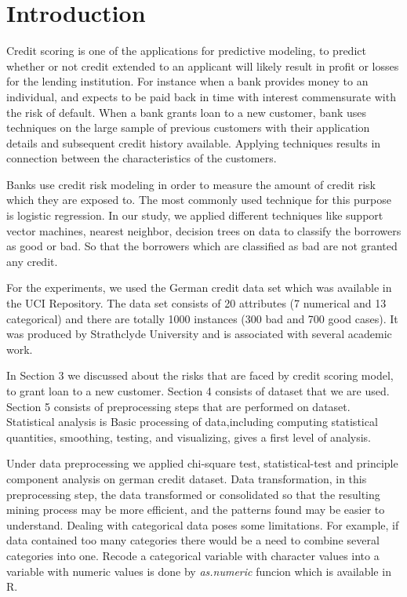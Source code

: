 \documentclass{article}\usepackage[]{graphicx}\usepackage[]{color}
\begin{document}
\section{Introduction} 
\hspace{0.5cm} Credit scoring is one of the applications for predictive modeling, to predict whether or not credit extended to an applicant will likely result in profit or losses for the lending institution. For instance when a bank provides money to an individual, and expects to be paid back in time with interest commensurate with the risk of default. When a bank grants loan to a new customer, bank uses techniques on the large sample of previous customers with their application details and subsequent credit history available. Applying techniques results in connection between the characteristics of the customers.
\par Banks use credit risk modeling in order to measure the amount of credit risk which they are exposed to. The most commonly used technique for this purpose is logistic regression. In our study, we applied different techniques like support vector machines, nearest neighbor, decision trees on data to classify the borrowers as good or bad. So that the borrowers which are classified as bad are not granted any credit.
\par For the experiments, we used the German credit data set which was available in the UCI Repository. The data set consists of 20 attributes (7 numerical and 13 categorical) and there are totally 1000 instances (300 bad and 700 good cases). It was produced by Strathclyde University and is associated with several academic work.
\par In Section 3 we discussed about the risks that are faced by credit scoring model, to grant loan to a new customer. Section 4 consists of dataset that we are used. Section 5 consists of preprocessing steps that are performed on dataset. Statistical analysis is Basic processing of data,including computing statistical quantities, smoothing, testing, and visualizing, gives a first level of analysis. 
\par Under data preprocessing we applied chi-square test, statistical-test and principle component analysis on german credit dataset. Data transformation, in this preprocessing step, the data transformed or consolidated so that the resulting mining process may be more efficient, and the patterns found may be easier to understand. Dealing with categorical data poses some limitations. For example, if data contained too many categories there would be a need to combine several categories into one. Recode a categorical variable with character values into a variable with numeric values is done by \textit{as.numeric} funcion which is available in R.
\end{document}
